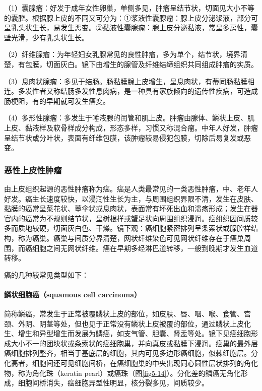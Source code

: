 （1）囊腺瘤：好发于成年女性卵巢，单侧多见，肿瘤呈结节状，切面见大小不等的囊腔。根据腺上皮的不同又可分为：①浆液性囊腺瘤：腺上皮分泌浆液，部分可呈乳头状生长，易发生恶变。②黏液性囊腺瘤：腺上皮分泌黏液，常呈多房性，囊壁光滑，少有乳头状生长。

（2）纤维腺瘤：为年轻妇女乳腺常见的良性肿瘤，多为单个，结节状，境界清楚，有包膜，切面灰白。镜下由增生的腺管及纤维结缔组织共同组成肿瘤的实质。

（3）息肉状腺瘤：多见于结肠。肠黏膜腺上皮增生，呈息肉状，有蒂同肠黏膜相连。多发性者又称结肠多发性息肉病，是一种具有家族倾向的遗传性疾病，可造成肠梗阻，有的早期就可发生癌变。

（4）多形性腺瘤：多发生于唾液腺的闰管和肌上皮。肿瘤由腺体、鳞状上皮、肌上皮、黏液样及软骨样成分构成，形态多样，习惯又称混合瘤。中年人好发，肿瘤呈结节状或分叶状，表面有纤维包膜，该肿瘤较易侵犯包膜，切除后易复发或恶变。

\subsubsection{恶性上皮性肿瘤}

由上皮组织起源的恶性肿瘤称为癌。癌是人类最常见的一类恶性肿瘤，中、老年人好发。癌生长速度较快，以浸润性生长为主，与周围组织界限不清，发生在皮肤、黏膜的癌常呈菜花状、蕈伞状或息肉状，表面常有坏死出血和溃疡形成；发生在器官内的癌常为不规则结节状，呈树根样或蟹足状向周围组织浸润。癌组织因间质较多而质地较硬，切面灰白色、干燥。镜下观：癌细胞紧密排列呈条索状或腺腔样结构，称为癌巢。癌巢与间质分界清楚，网状纤维染色可见网状纤维存在于癌巢周围，而癌细胞之间无网状纤维。癌在早期多经淋巴道转移，一般到晚期才发生血道转移。

癌的几种较常见类型如下：

\paragraph{鳞状细胞癌（squamous cell carcinoma）}
简称鳞癌，常发生于正常被覆鳞状上皮的部位，如皮肤、唇、咽、喉、食管、宫颈、外阴、阴茎等处，但也见于正常没有鳞状上皮被覆的部位，通过鳞状上皮化生、增生和异型增生而发展为鳞癌，如支气管、胆囊、肾盂等处。镜下见癌细胞形成大小不一的团块状或条索状的癌细胞巢，并向真皮或黏膜下浸润。癌巢的最外层癌细胞排列整齐，相当于基底层的细胞，其内可见多边形癌细胞，似棘细胞层。分化高者，细胞间还可见细胞间桥，在癌细胞巢的中央出现同心圆性层状排列的角化物，称为角化珠（keratin
pearl）或癌珠（图\ref{fig5-14}）。分化差的鳞癌无角化形成，细胞间桥消失，癌细胞异型性明显，核分裂多见，间质较少。

